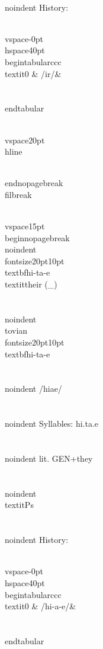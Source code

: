 \\noindent History:

\\vspace{-0pt}
\\hspace{40pt}
\\begin{tabular}{ccc}
\\textit{0} & /{}ir/& \\\\
\\end{tabular}

\\vspace{20pt}\\hline

\\end{nopagebreak}
\\filbreak



\\vspace{15pt}
\\begin{nopagebreak}
\\noindent{\\fontsize{20pt}{10pt}\\textbf{hi-ta-e} } \\textit{their} (_)\\\\
\\noindent {\\tovian \\fontsize{20pt}{10pt} \\textbf{hi-ta-e} }\\\\
\\noindent /hi{}{\textprimstress}ae/\\\\
\\noindent Syllables: hi.ta.e\\\\
\\noindent lit. GEN+they\\\\
\\noindent \\textit{Ps}\\\\


\\noindent History:

\\vspace{-0pt}
\\hspace{40pt}
\\begin{tabular}{ccc}
\\textit{0} & /hi-{}a-e/& \\\\
\\end{tabular}

